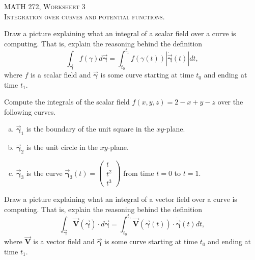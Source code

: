 \documentclass[12pt]{article} %
\newcommand{\vecfieldV}{\boldsymbol{\vec{V}}}
\newcommand{\curvegamma}{\boldsymbol{\vec{\gamma}}}
\newcommand{\tangentgamma}{\boldsymbol{\dot{\vec{\gamma}}}}
\begin{document}
\begin{center}
   \textsc{\large MATH 272, Worksheet 3}\\
   \textsc{Integration over curves and potential functions.}
\end{center}
\vspace{.5cm}



\begin{problem}
    Draw a picture explaining what an integral of a scalar field over a curve is computing. That is, explain the reasoning behind the definition
    \[
    \int_{\curvegamma} f(\gamma)d\curvegamma = \int_{t_0}^{t_1} f(\gamma(t))\left|\tangentgamma(t)\right|dt,
    \]
    where $f$ is a scalar field and $\curvegamma$ is some curve starting at time $t_0$ and ending at time $t_1$.
\end{problem}

\begin{problem}
Compute the integrals of the scalar field $f(x,y,z)=2-x+y-z$ over the following curves.
\begin{multicols}{2}
\begin{enumerate}[(a)]
    \item $\curvegamma_1$ is the boundary of the unit square in the $xy$-plane.  
    \item $\curvegamma_2$ is the unit circle in the $xy$-plane.
    \item $\curvegamma_3$ is the curve $\curvegamma_3(t)=\begin{pmatrix} t \\ t^2 \\ t^3 \end{pmatrix}$ from time $t=0$ to $t=1$.
\end{enumerate}
\end{multicols}
\end{problem}

\begin{problem}
    Draw a picture explaining what an integral of a vector field over a curve is computing. That is, explain the reasoning behind the definition
\[
\int_{\curvegamma} \vecfieldV(\curvegamma) \cdot d\curvegamma = \int_{t_0}^{t_1} \vecfieldV(\curvegamma(t))\cdot \tangentgamma(t) dt,
\]
where $\vecfieldV$ is a vector field and $\curvegamma$ is some curve starting at time $t_0$ and ending at time $t_1$.
\end{problem}
\end{document}
